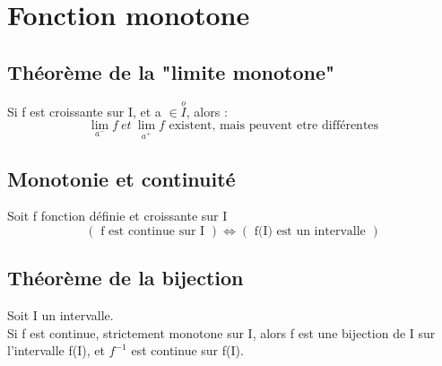 \section{Fonction monotone}
\subsection{Théorème de la "limite monotone"}
\begin{prop}
Si f est croissante sur I, et a $\in \overset{o}I$, alors :
$$\lim_{a^-} f~ et~ \lim_{a^+} f \mbox{ existent, mais peuvent etre différentes}$$
\end{prop}
\subsection{Monotonie et continuité}
\begin{prop}
Soit f fonction définie et croissante sur I\\
$$( \mbox{ f est continue sur I })\Leftrightarrow(\mbox{ f(I) est un intervalle })$$
\end{prop}
\subsection{Théorème de la bijection}
\begin{prop}
Soit I un intervalle.\\
Si f est continue, strictement monotone sur I, alors f est une bijection de I sur l'intervalle f(I), et $f^{-1}$ est continue sur f(I).
\end{prop}

